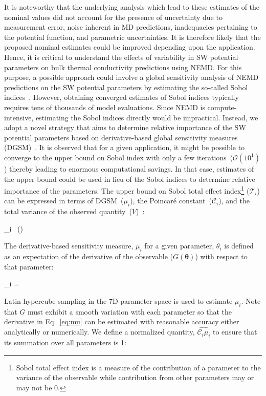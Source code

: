 It is noteworthy that the underlying analysis which lead to these estimates of the nominal values did not
account for the presence of uncertainty due to
measurement error, noise inherent in MD predictions, inadequacies pertaining to the potential function,
and parametric uncertainties. It is therefore likely that the proposed nominal estimates could be 
improved depending upon the application. Hence, it is critical to understand the effects of variability in
SW potential parameters on bulk thermal conductivity predictions using NEMD. For this purpose, a possible
approach could involve a global sensitivity analysis of NEMD predictions on the SW potential parameters 
by estimating the so-called Sobol indices~\cite{Sobol:2001}. However, obtaining converged estimates of
Sobol indices typically requires tens of thousands of model evaluations. Since NEMD is compute-intensive,
estimating the Sobol indices directly would be impractical. Instead, we adopt a novel strategy that
aims to determine relative importance of the SW potential parameters based on derivative-based global 
sensitivity measures (DGSM)~\cite{Sobol:2010}. It is observed that for a given application, it might be possible to 
converge to the upper bound on
Sobol index with only a few iterations~($\mathcal{O}(10^{1})$) thereby leading to enormous computational savings. 
In that case, estimates of the upper bound could be used in lieu of the
Sobol indices to determine relative importance of the parameters. The upper bound on 
Sobol total effect index\footnote{Sobol total effect index is a measure of the contribution of a 
parameter to the variance of the observable while contribution from other parameters may or may not be 0.}
($\mathcal{T}_i$) can be expressed in terms of DGSM~($\mu_i$), the Poincar\' e 
constant~($\mathcal{C}_i$), and the total variance of the observed
quantity~($V$)~\cite{Lamboni:2013,Roustant:2014}:   

\be
{}_i \leq {}~(\propto {}) 
\ee 

\noindent The derivative-based sensitivity measure, $\mu_i$ for a given parameter, $\theta_i$ is
defined as an expectation
of the derivative of the observable ($G(\bm{\theta})$) with respect to that parameter:

\be
\mu_i = 
\label{eq:mu}
\ee

\noindent Latin hypercube sampling in the 7D parameter space is used to estimate $\mu_i$. Note that $G$ must 
exhibit a smooth variation with each parameter so that the derivative in Eq.~\ref{eq:mu} can be estimated
with reasonable accuracy either analytically or numerically. 
We define a normalized quantity, $\hat{\mathcal{C}_i\mu_i}$ to ensure that its summation over all parameters is 1:

